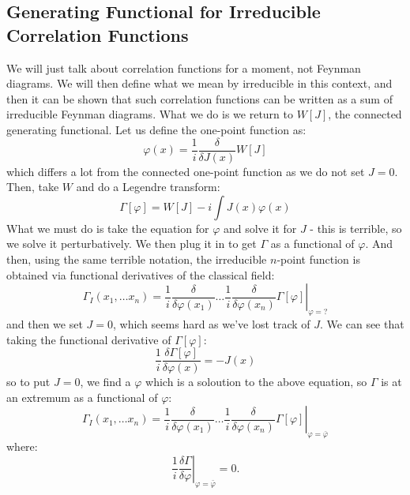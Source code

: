 \subsection{Generating Functional for Irreducible Correlation Functions}
We will just talk about correlation functions for a moment, not Feynman diagrams. We will then define what we mean by irreducible in this context, and then it can be shown that such correlation functions can be written as a sum of irreducible Feynman diagrams. What we do is we return to $W[J]$, the connected generating functional. Let us define the one-point function as:
\begin{equation}
    \varphi(x) = \frac{1}{i}\frac{\delta}{\delta J(x)}W[J]
\end{equation}
which differs a lot from the connected one-point function as we do not set $J = 0$. Then, take $W$ and do a Legendre transform:
\begin{equation}
    \Gamma[\varphi] = W[J] - i\int J(x)\varphi(x)
\end{equation}
What we must do is take the equation for $\varphi$ and solve it for $J$ - this is terrible, so we solve it perturbatively. We then plug it in to get $\Gamma$ as a functional of $\varphi$. And then, using the same terrible notation, the irreducible $n$-point function is obtained via functional derivatives of the classical field:
\begin{equation}
    \Gamma_I(x_1, \ldots x_n) = \left.\frac{1}{i}\frac{\delta}{\delta \varphi(x_1)} \ldots \frac{1}{i}\frac{\delta}{\delta \varphi(x_n)}\Gamma[\varphi]\right|_{\varphi = ?}
\end{equation}
and then we set $J = 0$, which seems hard as we've lost track of $J$. We can see that taking the functional derivative of $\Gamma[\varphi]$:
\begin{equation}
    \frac{1}{i}\frac{\delta \Gamma[\varphi]}{\delta \varphi(x)} = -J(x)
\end{equation}
so to put $J = 0$, we find a $\varphi$ which is a soloution to the above equation, so $\Gamma$ is at an extremum as a functional of $\varphi$:
\begin{equation}
    \Gamma_I(x_1, \ldots x_n) = \left.\frac{1}{i}\frac{\delta}{\delta \varphi(x_1)} \ldots \frac{1}{i}\frac{\delta}{\delta \varphi(x_n)}\Gamma[\varphi]\right|_{\varphi = \bar{\varphi}}
\end{equation}
where:
\begin{equation}
   \left. \frac{1}{i}\frac{\delta \Gamma}{\delta \varphi}\right|_{\varphi = \bar{\varphi}} = 0.
\end{equation}
